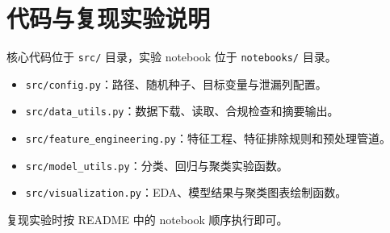 \appendix
\section{代码与复现实验说明}

核心代码位于 \texttt{src/} 目录，实验 notebook 位于 \texttt{notebooks/} 目录。

\begin{itemize}
  \item \texttt{src/config.py}：路径、随机种子、目标变量与泄漏列配置。
  \item \texttt{src/data\_utils.py}：数据下载、读取、合规检查和摘要输出。
  \item \texttt{src/feature\_engineering.py}：特征工程、特征排除规则和预处理管道。
  \item \texttt{src/model\_utils.py}：分类、回归与聚类实验函数。
  \item \texttt{src/visualization.py}：EDA、模型结果与聚类图表绘制函数。
\end{itemize}

复现实验时按 README 中的 notebook 顺序执行即可。

